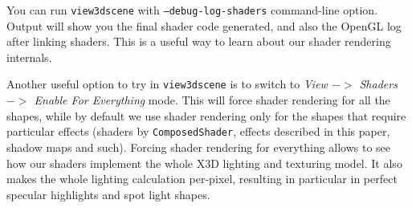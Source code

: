 \documentclass{acmsiggraph}                     %
\newcommand*{\myhref}[2]{\texttt{\href{#1}{\nolinkurl{#2}}}}
\begin{document}
You can run \texttt{view3dscene} with \texttt{--debug-log-shaders} command-line
option. Output will show you the final shader code generated,
and also the OpenGL log after linking shaders.
This is a useful way to learn about our shader rendering internals.

Another useful option to try in \texttt{view3dscene} is to switch to
\textit{View $->$ Shaders $->$ Enable For Everything} mode.
This will force shader rendering for all the shapes,
while by default we use shader rendering only for the shapes that
require particular effects (shaders by \texttt{ComposedShader}, effects
described in this paper, shadow maps and such).
Forcing shader rendering for everything allows to see
how our shaders implement the whole X3D lighting and texturing model.
It also makes the whole lighting calculation per-pixel, resulting
in particular in perfect specular highlights and spot light shapes.



\nocite{*}

\end{document}
